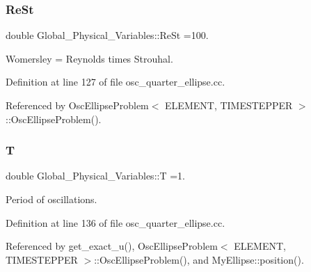 \mbox{\label{namespaceGlobal__Physical__Variables_a085ee4bf968ffdd01a41b8c41864f907}} 
\subsubsection{\texorpdfstring{Re\+St}{ReSt}}
{\footnotesize\ttfamily double Global\+\_\+\+Physical\+\_\+\+Variables\+::\+Re\+St =100.}



Womersley = Reynolds times Strouhal. 



Definition at line 127 of file osc\+\_\+quarter\+\_\+ellipse.\+cc.



Referenced by Osc\+Ellipse\+Problem$<$ E\+L\+E\+M\+E\+N\+T, T\+I\+M\+E\+S\+T\+E\+P\+P\+E\+R $>$\+::\+Osc\+Ellipse\+Problem().

\mbox{\label{namespaceGlobal__Physical__Variables_a1a806ee7c4d04d6afaba1d24d94dceea}} 
\subsubsection{\texorpdfstring{T}{T}}
{\footnotesize\ttfamily double Global\+\_\+\+Physical\+\_\+\+Variables\+::T =1.}



Period of oscillations. 



Definition at line 136 of file osc\+\_\+quarter\+\_\+ellipse.\+cc.



Referenced by get\+\_\+exact\+\_\+u(), Osc\+Ellipse\+Problem$<$ E\+L\+E\+M\+E\+N\+T, T\+I\+M\+E\+S\+T\+E\+P\+P\+E\+R $>$\+::\+Osc\+Ellipse\+Problem(), and My\+Ellipse\+::position().

